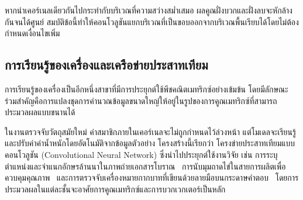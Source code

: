 หากนำเคอร์เนลเดียวกันไปกระทำกับบริเวณที่ความสว่างสม่ำเสมอ ผลคูณฝั่งบวกและฝั่งลบจะหักล้างกันจนได้ศูนย์ สมบัติข้อนี้ทำให้คอนโวลูชันแยกบริเวณที่เป็นขอบออกจากบริเวณพื้นเรียบได้โดยไม่ต้องกำหนดเงื่อนไขเพิ่ม

\subsection{การเรียนรู้ของเครื่องและเครือข่ายประสาทเทียม}
\label{ssec:ml-matrix}
การเรียนรู้ของเครื่องเป็นอีกหนึ่งสาขาที่มีการประยุกต์ใช้พีชคณิตเมทริกซ์อย่างเข้มข้น โดยมีลักษณะร่วมสำคัญคือการแปลงชุดการคำนวณข้อมูลขนาดใหญ่ให้อยู่ในรูปของการคูณเมทริกซ์ที่สามารถประมวลผลแบบขนานได้

ในงานตรวจจับวัตถุสมัยใหม่ ค่าสมาชิกภายในเคอร์เนลจะไม่ถูกกำหนดไว้ล่วงหน้า แต่โมเดลจะเรียนรู้และปรับค่าค่าน้ำหนักโดยอัตโนมัติจากข้อมูลตัวอย่าง โครงสร้างนี้เรียกว่า โครงข่ายประสาทเทียมแบบคอนโวลูชัน (Convolutional Neural Network) ซึ่งนำไปประยุกต์ใช้งานวิจัย เช่น การระบุตำแหน่งและจำแนกอักษรล้านนาในภาพถ่ายเอกสารโบราณ~\parencite{nakjai2026lanna} การนับมุมถาดไข่ในสายการผลิตเพื่อควบคุมคุณภาพ~\parencite{nakjai2026eggtray} และการตรวจจับเครื่องหมายกากบาทที่เขียนด้วยลายมือบนกระดาษคำตอบ~\parencite{nakjai2024xmark} โดยการประมวลผลในแต่ละชั้นจะอาศัยการคูณเมทริกซ์และการบวกเวกเตอร์เป็นหลัก

